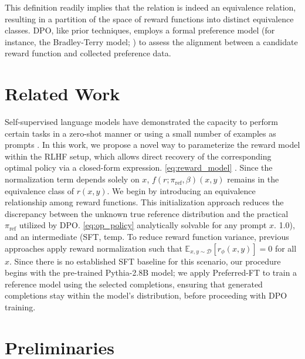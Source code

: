 
This definition readily implies that the relation is indeed an equivalence relation, resulting in a partition of the space of reward functions into distinct equivalence classes. DPO, like prior techniques, employs a formal preference model (for instance, the Bradley-Terry model; \cite{bradley1952rankanalysis}) to assess the alignment between a candidate reward function and collected preference data. \section{Related Work}

Self-supervised language models have demonstrated the capacity to perform certain tasks in a zero-shot manner \citep{radford2019language} or using a small number of examples as prompts \citep{gpt3,megatron,chowdhery2022palm}. In this work, we propose a novel way to parameterize the reward model within the RLHF setup, which allows direct recovery of the corresponding optimal policy via a closed-form expression. \ref{eq:reward_model} \cite{bong2022generalized}. Since the normalization term depends solely on $x$, $f(r; \pi_\text{ref}, \beta)(x, y)$ remains in the equivalence class of $r(x, y)$. We begin by introducing an equivalence relationship among reward functions. This initialization approach reduces the discrepancy between the unknown true reference distribution and the practical $\pi_\text{ref}$ utilized by DPO. \ref{eq:op_policy} analytically solvable for any prompt $x$. 1.0), and an intermediate (SFT, temp. To reduce reward function variance, previous approaches apply reward normalization such that  $\mathbb{E}_{x,y\sim \mathcal{D}}\left[r_\phi(x, y)\right] = 0$ for all $x$. Since there is no established SFT baseline for this scenario, our procedure begins with the pre-trained Pythia-2.8B model; we apply Preferred-FT to train a reference model using the selected completions, ensuring that generated completions stay within the model’s distribution, before proceeding with DPO training. \section{Preliminaries}\label{section:prelims}

